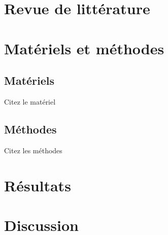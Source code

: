 \documentclass[12pt]{report}
\begin{document}
\pageDeGarde







\tableofcontents

\listofalgorithms

\listoffigures 

\listoftables


{}
\setcounter{page}{1}


\printglossaries



\lhead[]{} \rhead[]{} \chead[]{}



\fancyhead[L]{\tiny \leftmark}
\fancyhead[R]{\scriptsize \rightmark}
\fancyfoot[C]{\thepage}

\chapter{Revue de littérature}
	

\chapter{Matériels et méthodes}
\section{Matériels}
Citez le matériel
\section{Méthodes}
Citez les méthodes
\chapter{Résultats}
\chapter{Discussion}

%
\lhead[]{} \rhead[]{} \chead[]{}



%

\appendix

\end{document}
